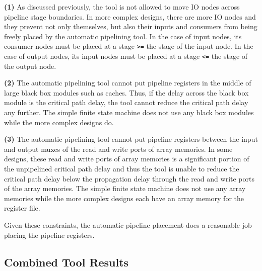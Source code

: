 {\bf (1)} 
As discussed previously, the tool is not allowed to move IO nodes across pipeline stage boundaries. In more complex designs, there are more IO nodes and they prevent not only themselves, but also their inputs and consumers from being freely placed by the automatic pipelining tool. In the case of input nodes, its consumer nodes must be placed at a stage {\tt >=} the stage of the input node. In the case of output nodes, its input nodes must be placed at a stage {\tt <=} the stage of the output node.

{\bf (2)}  
The automatic pipelining tool cannot put pipeline registers in the middle of large black box modules such as caches. Thus, if the delay across the black box module is the critical path delay, the tool cannot reduce the critical path delay any further. The simple finite state machine does not use any black box modules while the more complex designs do.

{\bf (3)} 
The automatic pipelining tool cannot put pipeline registers between the input and output muxes of the read and write ports of array memories. In some designs, these read and write ports of array memories is a significant portion of the unpipelined critical path delay and thus the tool is unable to reduce the critical path delay below the propagation delay through the read and write ports of the array memories. The simple finite state machine does not use any array memories while the more complex designs each have an array memory for the register file.

Given these constraints, the automatic pipeline placement does a reasonable job placing the pipeline registers.
\subsection{Combined Tool Results}
\begin{table}[htb]
	\centering
	\caption{{\bf 2 Stage Pipelined Design Delay Data} The delays are in units of ns and are obtained from post-synthesis data.}
	\label{fig:comb_delays2}
\end{table}

